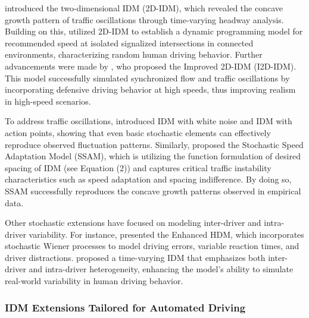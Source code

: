 \documentclass[a4paper,fleqn]{cas-sc}
\begin{document}
\cite{jiangTrafficExperimentRevealsNature2014} introduced the two-dimensional IDM (2D-IDM), which revealed the concave growth pattern of traffic oscillations through time-varying headway analysis. Building on this, \cite{xiong_speed_2022} utilized 2D-IDM to establish a dynamic programming model for recommended speed at isolated signalized intersections in connected environments, characterizing random human driving behavior. Further advancements were made by \cite{tianImproved2DIntelligentDriver2016}, who proposed the Improved 2D-IDM (I2D-IDM). This model successfully simulated synchronized flow and traffic oscillations by incorporating defensive driving behavior at high speeds, thus improving realism in high-speed scenarios.

To address traffic oscillations, \cite{treiberIntelligentDriverModelStochasticity2018} introduced IDM with white noise and IDM with action points, showing that even basic stochastic elements can effectively reproduce observed fluctuation patterns. Similarly, \cite{tianRoleSpeedAdaptationSpacing2019} proposed the Stochastic Speed Adaptation Model (SSAM), which is utilizing the function formulation of desired spacing of IDM (see Equation (2)) and captures critical traffic instability characteristics such as speed adaptation and spacing indifference. By doing so, SSAM successfully reproduces the concave growth patterns observed in empirical data.

Other stochastic extensions have focused on modeling inter-driver and intra-driver variability. For instance, \cite{lindorfer_modeling_2018} presented the Enhanced HDM, which incorporates stochastic Wiener processes to model driving errors, variable reaction times, and driver distractions. \cite{zhangGenerativeCarFollowingModelConditioned2022c} proposed a time-varying IDM that emphasizes both inter-driver and intra-driver heterogeneity, enhancing the model's ability to simulate real-world variability in human driving behavior.

\subsubsection{IDM Extensions Tailored for Automated Driving}
\end{document}
